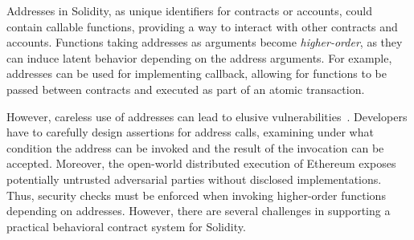 
Addresses in Solidity, as unique identifiers for contracts or accounts, could contain 
callable functions, providing a way to interact with other contracts and accounts.
Functions taking addresses as arguments become \emph{higher-order}, as they can induce latent behavior depending on the address arguments.
For example, addresses can be used for implementing callback, 
allowing for functions to be passed between contracts and executed as part of an atomic transaction.

However, careless use of addresses can lead to elusive vulnerabilities~\cite{dexibleHack}.
Developers have to carefully design assertions for address calls, 
examining 
under what condition the address can be invoked and 
the result of the invocation can be accepted.
Moreover, the open-world distributed execution 
of Ethereum exposes 
potentially untrusted adversarial parties without disclosed implementations.
Thus, security checks must be enforced when invoking higher-order functions depending on addresses. 
However, there are several challenges in supporting a practical behavioral contract system for Solidity. 

